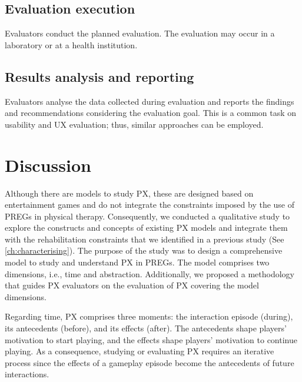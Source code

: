 \subsection{Evaluation execution}
Evaluators conduct the planned evaluation. The evaluation may occur in a laboratory or at a health institution.

\subsection{Results analysis and reporting}
Evaluators analyse the data collected during evaluation and reports the findings and recommendations considering the evaluation goal. This is a common task on usability and \ac{UX} evaluation; thus, similar approaches can be employed.


\section{Discussion} %
\label{sec:discussion_model}
Although there are models to study \ac{PX}, these are designed based on entertainment games and do not integrate the constraints imposed by the use of \acp{PREG} in physical therapy. Consequently, we conducted a qualitative study to explore the constructs and concepts of existing \ac{PX} models and integrate them with the rehabilitation constraints that we identified in a previous study (See \autoref{ch:characterising}). The purpose of the study was to design a comprehensive model to study and understand \ac{PX} in \acp{PREG}. The model comprises two dimensions, i.e., time and abstraction. Additionally, we proposed a methodology that guides \ac{PX} evaluators on the evaluation of \ac{PX} covering the model dimensions.

Regarding time, \ac{PX} comprises three moments: the interaction episode (during), its antecedents (before), and its effects (after). The antecedents shape players' motivation to start playing, and the effects shape players' motivation to continue playing. As a consequence, studying or evaluating \ac{PX} requires an iterative process since the effects of a gameplay episode become the antecedents of future interactions.

